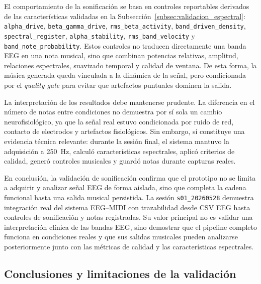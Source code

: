 \documentclass[../main.tex]{subfiles}
\begin{document}
El comportamiento de la sonificación se basa en controles reportables derivados de las características validadas en la Subsección~\ref{subsec:validacion_espectral}: \texttt{alpha\_drive}, \texttt{beta\_gamma\_drive}, \texttt{rms\_beta\_activity}, \texttt{band\_driven\_density}, \texttt{spectral\_register}, \texttt{alpha\_stability}, \texttt{rms\_band\_velocity} y \texttt{band\_note\_probability}. Estos controles no traducen directamente una banda EEG en una nota musical, sino que combinan potencias relativas, amplitud, relaciones espectrales, suavizado temporal y calidad de ventana. De esta forma, la música generada queda vinculada a la dinámica de la señal, pero condicionada por el \textit{quality gate} para evitar que artefactos puntuales dominen la salida.

La interpretación de los resultados debe mantenerse prudente. La diferencia en el número de notas entre condiciones no demuestra por sí sola un cambio neurofisiológico, ya que la señal real estuvo condicionada por ruido de red, contacto de electrodos y artefactos fisiológicos. Sin embargo, sí constituye una evidencia técnica relevante: durante la sesión final, el sistema mantuvo la adquisición a \SI{250}{\hertz}, calculó características espectrales, aplicó criterios de calidad, generó controles musicales y guardó notas durante capturas reales.

En conclusión, la validación de sonificación confirma que el prototipo no se limita a adquirir y analizar señal EEG de forma aislada, sino que completa la cadena funcional hasta una salida musical persistida. La sesión \texttt{s01\_20260528} demuestra integración real del sistema EEG--MIDI con trazabilidad desde CSV EEG hasta controles de sonificación y notas registradas. Su valor principal no es validar una interpretación clínica de las bandas EEG, sino demostrar que el pipeline completo funciona en condiciones reales y que sus salidas musicales pueden analizarse posteriormente junto con las métricas de calidad y las características espectrales.



\subsection{Conclusiones y limitaciones de la validación}
\label{subsec:validacion_conclusiones_limitaciones}

\end{document}
